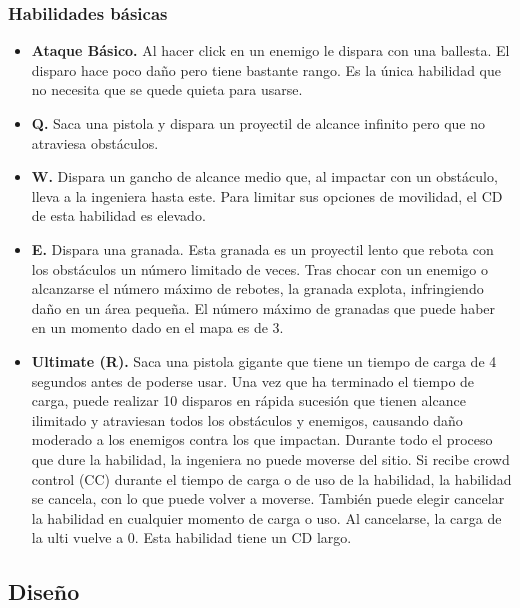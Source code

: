 \subsubsection{Habilidades básicas}
\begin{itemize}
\item \textbf{Ataque Básico.} Al hacer click en un enemigo le dispara con una ballesta. El disparo hace poco daño pero tiene bastante rango. Es la única habilidad que no necesita que se quede quieta para usarse.
\item \textbf{Q.} Saca una pistola y dispara un proyectil de alcance infinito pero que no atraviesa obstáculos.
\item \textbf{W.} Dispara un gancho de alcance medio que, al impactar con un obstáculo, lleva a la ingeniera hasta este. Para limitar sus opciones de movilidad, el CD de esta habilidad es elevado.
\item \textbf{E.} Dispara una granada. Esta granada es un proyectil lento que rebota con los obstáculos un número limitado de veces. Tras chocar con un enemigo o alcanzarse el número máximo de rebotes, la granada explota, infringiendo daño en un área pequeña. El número máximo de granadas que puede haber en un momento dado en el mapa es de 3.
\item \textbf{Ultimate (R).} Saca una pistola gigante que tiene un tiempo de carga de 4 segundos antes de poderse usar. Una vez que ha terminado el tiempo de carga, puede realizar 10 disparos en rápida sucesión que tienen alcance ilimitado y atraviesan todos los obstáculos y enemigos, causando daño moderado a los enemigos contra los que impactan. Durante todo el proceso que dure la habilidad, la ingeniera no puede moverse del sitio. Si recibe crowd control (CC) durante el tiempo de carga o de uso de la habilidad, la habilidad se cancela, con lo que puede volver a moverse. También puede elegir cancelar la habilidad en cualquier momento de carga o uso. Al cancelarse, la carga de la ulti vuelve a 0. Esta habilidad tiene un CD largo.
\end{itemize}

\subsection{Diseño}

